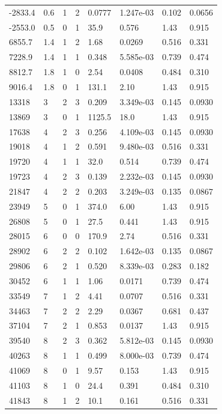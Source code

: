 \documentclass[preview]{standalone}
\begin{document}
{{\begin{tabular}{L{1.2cm}C{1.2cm} C{0.3cm}C{0.5cm} C{1.4cm}C{1.4cm} C{1.4cm}C{1.4cm}}
  -2833.4  &   0.6  & 1     &  2 &  0.0777  & 1.247e-03  & 0.102 &  0.0656   \\ 
  -2553.0  &   0.5  & 0     &  1 &  35.9  & 0.576  & 1.43 &  0.915   \\ 
  6855.7  &   1.4  & 1     &  2 &  1.68  & 0.0269  & 0.516 &  0.331   \\ 
  7228.9  &   1.4  & 1     &  1 &  0.348  & 5.585e-03  & 0.739 &  0.474   \\ 
  8812.7  &   1.8  & 1     &  0 &  2.54  & 0.0408  & 0.484 &  0.310   \\ 
  9016.4  &   1.8  & 0     &  1 &  131.1  & 2.10  & 1.43 &  0.915   \\ 
  13318  &     3  & 2     &  3 &  0.209  & 3.349e-03  & 0.145 &  0.0930   \\ 
  13869  &     3  & 0     &  1 &  1125.5  & 18.0  & 1.43 &  0.915   \\ 
  17638  &     4  & 2     &  3 &  0.256  & 4.109e-03  & 0.145 &  0.0930   \\ 
  19018  &     4  & 1     &  2 &  0.591  & 9.480e-03  & 0.516 &  0.331   \\ 
  19720  &     4  & 1     &  1 &  32.0  & 0.514  & 0.739 &  0.474   \\ 
  19723  &     4  & 2     &  3 &  0.139  & 2.232e-03  & 0.145 &  0.0930   \\ 
  21847  &     4  & 2     &  2 &  0.203  & 3.249e-03  & 0.135 &  0.0867   \\ 
  23949  &     5  & 0     &  1 &  374.0  & 6.00  & 1.43 &  0.915   \\ 
  26808  &     5  & 0     &  1 &  27.5  & 0.441  & 1.43 &  0.915   \\ 
  28015  &     6  & 0     &  0 &  170.9  & 2.74  & 0.516 &  0.331   \\ 
  28902  &     6  & 2     &  2 &  0.102  & 1.642e-03  & 0.135 &  0.0867   \\ 
  29806  &     6  & 2     &  1 &  0.520  & 8.339e-03  & 0.283 &  0.182   \\ 
  30452  &     6  & 1     &  1 &  1.06  & 0.0171  & 0.739 &  0.474   \\ 
  33549  &     7  & 1     &  2 &  4.41  & 0.0707  & 0.516 &  0.331   \\ 
  34463  &     7  & 2     &  2 &  2.29  & 0.0367  & 0.681 &  0.437   \\ 
  37104  &     7  & 2     &  1 &  0.853  & 0.0137  & 1.43 &  0.915   \\ 
  39540  &     8  & 2     &  3 &  0.362  & 5.812e-03  & 0.145 &  0.0930   \\ 
  40263  &     8  & 1     &  1 &  0.499  & 8.000e-03  & 0.739 &  0.474   \\ 
  41069  &     8  & 0     &  1 &  9.57  & 0.153  & 1.43 &  0.915   \\ 
  41103  &     8  & 1     &  0 &  24.4  & 0.391  & 0.484 &  0.310   \\ 
  41843  &     8  & 1     &  2 &  10.1  & 0.161  & 0.516 &  0.331   \\ 
\hline 
\end{tabular} 

}}
\end{document}
